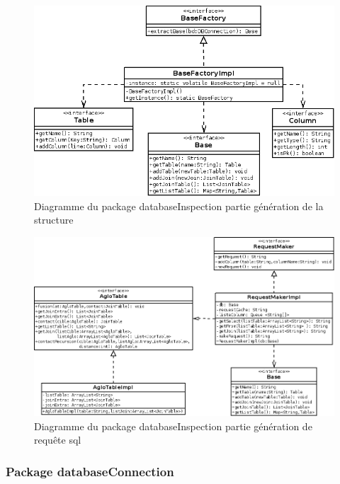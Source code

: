 \documentclass[12pt]{report}
\begin{document}
\begin{figure}[h!]
\begin{center}
\includegraphics[scale=0.5]{bduml/baseFactory.png}
\caption{Diagramme du package databaseInspection partie génération de la structure}
\end{center}
\end{figure}

\begin{figure}[h!]
\begin{center}
\includegraphics[scale=0.5]{bduml/cookingRequeste.png}
\caption{Diagramme du package databaseInspection partie génération de requête sql}
\end{center}
\end{figure}


\subsubsection*{Package databaseConnection}
\end{document}
